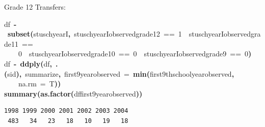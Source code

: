 \documentclass[12pt]{article}
\makeatletter
\newcommand{\hlnumber}[1]{\textcolor[rgb]{0,0,0}{#1}}%
\newcommand{\hlfunctioncall}[1]{\textcolor[rgb]{0.501960784313725,0,0.329411764705882}{\textbf{#1}}}%
\newcommand{\hlkeyword}[1]{\textcolor[rgb]{0,0,0}{\textbf{#1}}}%
\newcommand{\hlargument}[1]{\textcolor[rgb]{0.690196078431373,0.250980392156863,0.0196078431372549}{#1}}%
\newcommand{\hlassignement}[1]{\textcolor[rgb]{0,0,0}{\textbf{#1}}}%
\newcommand{\hlsymbol}[1]{\textcolor[rgb]{0,0,0}{#1}}%
\newcommand{\hlstd}[1]{\textcolor[rgb]{0,0,0}{#1}}%
\newenvironment{kframe}{%
 \def\FrameCommand##1{\hskip\@totalleftmargin \hskip-\fboxsep
 \colorbox{shadecolor}{##1}\hskip-\fboxsep
     \hskip-\linewidth \hskip-\@totalleftmargin \hskip\columnwidth}%
 \MakeFramed {\advance\hsize-\width
   \@totalleftmargin\z@ \linewidth\hsize
   \@setminipage}}%
 {\par\unskip\endMakeFramed}
\newenvironment{knitrout}{}{} %
\renewenvironment{knitrout}{\begin{footnotesize}}{\end{footnotesize}}
\makeatother
\begin{document}
Grade 12 Transfers:
\begin{knitrout}
\color{fgcolor}\begin{kframe}
\begin{flushleft}
\ttfamily\noindent
\hlsymbol{df}{\ }\hlassignement{\usebox{\hlnormalsizeboxlessthan}-}{\ }\hlfunctioncall{subset}\hlkeyword{(}\hlsymbol{stuschyearI}\hlkeyword{,}{\ }\hlsymbol{stuschyearI}\hlkeyword{\usebox{\hlnormalsizeboxdollar}}\hlsymbol{observed\usebox{\hlnormalsizeboxunderscore}grade\usebox{\hlnormalsizeboxunderscore}12}{\ }=={\ }\hlnumber{1}{\ }\hlkeyword{\usebox{\hlnormalsizeboxand}}{\ }\hlsymbol{stuschyearI}\hlkeyword{\usebox{\hlnormalsizeboxdollar}}\hlsymbol{observed\usebox{\hlnormalsizeboxunderscore}grade\usebox{\hlnormalsizeboxunderscore}11}{\ }==\hspace*{\fill}\\
\hlstd{}{\ }{\ }{\ }{\ }\hlnumber{0}{\ }\hlkeyword{\usebox{\hlnormalsizeboxand}}{\ }\hlsymbol{stuschyearI}\hlkeyword{\usebox{\hlnormalsizeboxdollar}}\hlsymbol{observed\usebox{\hlnormalsizeboxunderscore}grade\usebox{\hlnormalsizeboxunderscore}10}{\ }=={\ }\hlnumber{0}{\ }\hlkeyword{\usebox{\hlnormalsizeboxand}}{\ }\hlsymbol{stuschyearI}\hlkeyword{\usebox{\hlnormalsizeboxdollar}}\hlsymbol{observed\usebox{\hlnormalsizeboxunderscore}grade\usebox{\hlnormalsizeboxunderscore}9}{\ }=={\ }\hlnumber{0}\hlkeyword{)}\hspace*{\fill}\\
\hlstd{}\hlsymbol{df}{\ }\hlassignement{\usebox{\hlnormalsizeboxlessthan}-}{\ }\hlfunctioncall{ddply}\hlkeyword{(}\hlsymbol{df}\hlkeyword{,}{\ }\hlfunctioncall{.}\hlkeyword{(}\hlsymbol{sid}\hlkeyword{)}\hlkeyword{,}{\ }\hlsymbol{summarize}\hlkeyword{,}{\ }\hlargument{first9yearobserved}{\ }\hlargument{=}{\ }\hlfunctioncall{min}\hlkeyword{(}\hlsymbol{first9thschoolyear\usebox{\hlnormalsizeboxunderscore}observed}\hlkeyword{,}\hspace*{\fill}\\
\hlstd{}{\ }{\ }{\ }{\ }\hlargument{na.rm}{\ }\hlargument{=}{\ }\hlsymbol{T}\hlkeyword{)}\hlkeyword{)}\hspace*{\fill}\\
\hlstd{}\hlfunctioncall{summary}\hlkeyword{(}\hlfunctioncall{as.factor}\hlkeyword{(}\hlsymbol{df}\hlkeyword{\usebox{\hlnormalsizeboxdollar}}\hlsymbol{first9yearobserved}\hlkeyword{)}\hlkeyword{)}\mbox{}
\normalfont
\end{flushleft}
\begin{verbatim}
1998 1999 2000 2001 2002 2003 2004 
 483   34   23   18   10   19   18 
\end{verbatim}
\end{kframe}
\end{knitrout}
\end{document}

